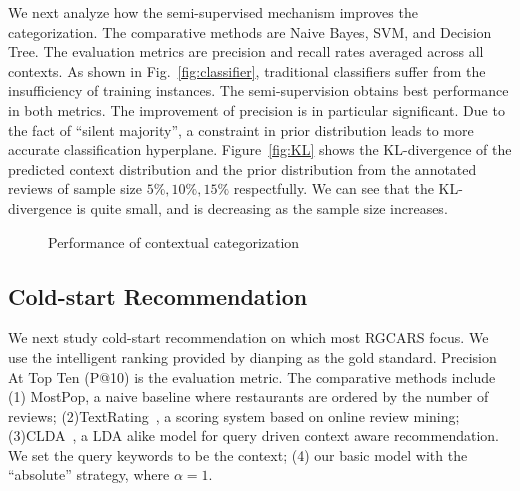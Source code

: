 \documentclass[preprint,12pt]{elsarticle}
\begin{document}
We next analyze how the semi-supervised mechanism improves the categorization. The comparative methods are Naive Bayes, SVM, and Decision Tree. The evaluation metrics are precision and recall rates averaged across all contexts. As shown in Fig.~\ref{fig:classifier}, traditional classifiers suffer from the insufficiency of training instances. The semi-supervision obtains best performance in both metrics. The improvement of precision is in particular significant. Due to the fact of ``silent majority'', a constraint in prior distribution leads to more accurate classification hyperplane. Figure~\ref{fig:KL} shows the KL-divergence of the predicted context distribution and the prior distribution from the annotated reviews of sample size $5\%,10\%,15\%$ respectfully. We can see that the KL-divergence is quite small, and is decreasing as the sample size increases.
\begin{figure}
\centering
{}
\caption{Performance of contextual categorization}
\end{figure}

\subsection{Cold-start Recommendation}

We next study cold-start recommendation on which most RGCARS focus. We use the intelligent ranking provided by dianping as the gold standard. Precision At Top Ten (P@10) is the evaluation metric. The comparative methods include (1) MostPop, a naive baseline where restaurants are ordered by the number of reviews; (2)TextRating~\cite{Levi2012Finding}, a scoring system based on online review mining; (3)CLDA~\cite{Hariri2013Query}, a LDA alike model for query driven context aware recommendation. We set the query keywords to be the context; (4) our basic model with the ``absolute'' strategy, where $\alpha=1$.
\end{document}
